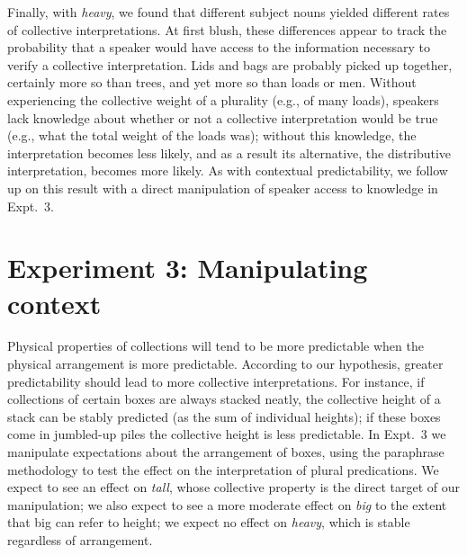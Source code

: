 \documentclass[linguex]{sp}
\begin{document}
Finally, with \emph{heavy}, we found that different subject nouns yielded different rates of collective interpretations. At first blush, these differences appear to track the probability that a speaker would have access to the information necessary to verify a collective interpretation. Lids and bags are probably picked up together, certainly more so than trees, and yet more so than loads or men. Without experiencing the collective weight of a plurality (e.g., of many loads), speakers lack knowledge about whether or not a collective interpretation would be true (e.g., what the total weight of the loads was); without this knowledge, the interpretation becomes less likely, and as a result its alternative, the distributive interpretation, becomes more likely. As with contextual predictability, we follow up on this result with a direct manipulation of speaker access to knowledge in Expt.~3.


\section{Experiment 3: Manipulating context}


Physical properties of collections will tend to be more predictable when the physical arrangement is more predictable. 
According to our hypothesis, greater predictability should lead to more collective interpretations.
For instance, if collections of certain boxes are always stacked neatly, the collective height of a stack can be stably predicted (as the sum of individual heights); if these boxes come in jumbled-up piles the collective height is less predictable.
In Expt.~3 we manipulate expectations about the arrangement of boxes, using the paraphrase methodology to test the effect on the interpretation of plural predications. We expect to see an effect on \emph{tall}, whose collective property is the direct target of our manipulation; we also expect to see a more moderate effect on \emph{big} to the extent that big can refer to height; we expect no effect on \emph{heavy}, which is stable regardless of arrangement.
\end{document}
